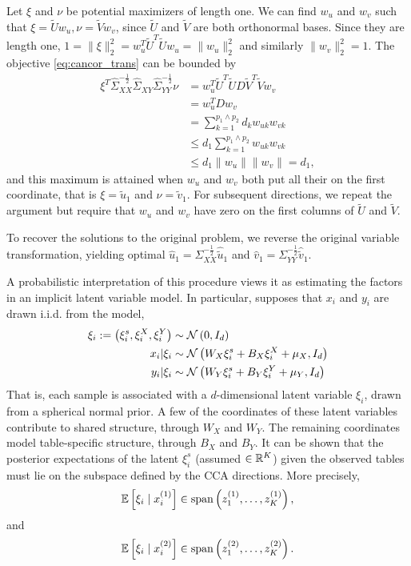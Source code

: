 \documentclass{article}
\begin{document}
Let $\xi$ and $\nu$ be potential maximizers of length one. We can find $w_{u}$
and $w_{v}$ such that $\xi = \tilde{U}w_{u}, \nu = \tilde{V}w_{v}$, since
$\tilde{U}$ and $\tilde{V}$ are both orthonormal bases. Since they are length
one, $1 = \|\xi\|^{2}_{2} = w_{u}^{T}\tilde{U}^{T}\tilde{U}w_{u} =
\|w_{u}\|_{2}^{2}$ and similarly $\|w_{v}\|_{2}^{2} = 1$. The objective
\ref{eq:cancor_trans} can be bounded by
\begin{align*}
\xi^{T}\hat{\Sigma}_{XX}^{-\frac{1}{2}}\hat{\Sigma}_{XY}\hat{\Sigma}_{YY}^{-\frac{1}{2}}\nu
&= w_{u}^{T}\tilde{U}^{T}\tilde{U}D\tilde{V}^{T}\tilde{V}w_{v} \\
&= w_{u}^{T}Dw_{v} \\
&= \sum_{k = 1}^{p_{1} \wedge p_{2}} d_{k}w_{uk}w_{vk} \\
&\leq d_{1} \sum_{k = 1}^{p_{1} \wedge p_{2}} w_{uk}w_{vk} \\
&\leq d_{1} \|w_{u}\|\|w_{v}\| = d_{1},
\end{align*}
and this maximum is attained when $w_{u}$ and $w_{v}$ both put all their
on the first coordinate, that is $\xi = \tilde{u}_{1}$ and $\nu =
\tilde{v}_{1}$. For subsequent directions, we repeat the argument but require
that $w_{u}$ and $w_{v}$ have zero  on the first columns of $\tilde{U}$
and $\tilde{V}$.

To recover the solutions to the original problem, we reverse the original
variable transformation, yielding optimal $\hat{u}_{1} =
\Sigma_{XX}^{-\frac{1}{2}}\hat{\tilde{u}}_{1}$ and $\hat{v}_{1} =
\Sigma_{YY}^{-\frac{1}{2}}\hat{\tilde{v}}_{1}$.

A probabilistic interpretation of this procedure views it as estimating the
factors in an implicit latent variable model. In particular,
\citep{bach2005probabilistic} supposes that $x_{i}$ and $y_{i}$ are drawn i.i.d.
from the model,
\begin{align*}
  \xi_{i} := \left(\xi_{i}^{s}, \xi_{i}^{X}, \xi_{i}^{Y}\right) &\sim
  \mathcal{N}\left(0, I_{d}\right) \\
  x_{i} \vert \xi_{i} &\sim \mathcal{N}\left(W_{X}\xi_{i}^{s} + B_{X}\xi_{i}^{X} + \mu_{X},
  I_{d} \right) \\
  y_{i} \vert \xi_{i} &\sim \mathcal{N}\left(W_{Y}\xi_{i}^{s} +
  B_{Y}\xi_{i}^{Y} + \mu_{Y}, I_{d}\right)
\end{align*}
That is, each sample is associated with a $d$-dimensional latent variable
$\xi_{i}$, drawn from a spherical normal prior. A few of the coordinates of
these latent variables contribute to shared structure, through $W_{X}$ and
$W_{Y}$. The remaining coordinates model table-specific structure, through
$B_{X}$ and $B_{Y}$. It can be shown that the posterior expectations of the
latent $\xi_{i}^{s}$ (assumed $\in \mathbb{R}^{K}$) given the observed tables must
lie on the subspace defined by the CCA directions. More precisely,
\begin{align*}
  \mathbb{E}\left[{\xi_{i} \mid x_{i}^{(1)}}\right] \in \text{span}\left(z_{1}^{(1)},
    \dots, z_{K}^{(1)}\right),
\end{align*}
and
\begin{align*}
  \mathbb{E}\left[{\xi_{i} \mid x_{i}^{(2)}}\right] \in \text{span}\left(z_{1}^{(2)},
    \dots, z_{K}^{(2)}\right).
\end{align*}
\end{document}
